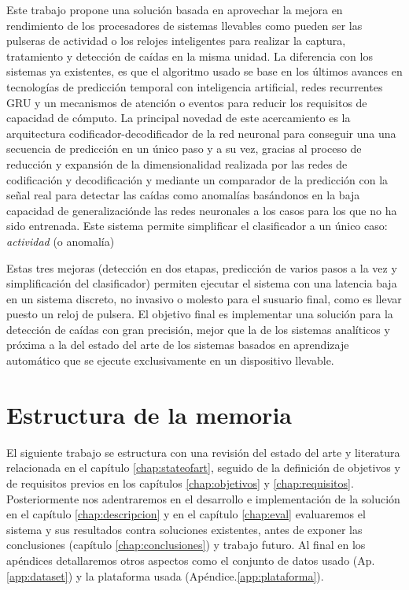 Este trabajo propone una solución basada en aprovechar la mejora en rendimiento de los procesadores de sistemas llevables como pueden ser las pulseras de actividad o los relojes inteligentes para realizar la captura, tratamiento y detección de caídas en la misma unidad. La diferencia con los sistemas ya existentes, es que el algoritmo usado se base en los últimos avances en tecnologías de predicción temporal con inteligencia artificial, redes recurrentes GRU y un mecanismos de atención o eventos para reducir los requisitos de capacidad de cómputo. La principal novedad de este acercamiento es la arquitectura codificador-decodificador de la red neuronal para conseguir una una secuencia de predicción en un único paso y a su vez, gracias al proceso de reducción y expansión de la dimensionalidad realizada por las redes de codificación y decodificación y mediante un comparador de la predicción con la señal real para detectar las caídas como anomalías basándonos en la baja capacidad de generalizaciónde las redes neuronales a los casos para los que no ha sido entrenada. Este sistema permite simplificar el clasificador a un único caso: \textit{actividad} (o anomalía)

Estas tres mejoras (detección en dos etapas, predicción de varios pasos a la vez y simplificación del clasificador) permiten ejecutar el sistema con una latencia baja en un sistema discreto, no invasivo o molesto para el susuario final, como es llevar puesto un reloj de pulsera. El objetivo final es implementar una solución para la detección de caídas con gran precisión, mejor que la de los sistemas analíticos y próxima a la del estado del arte de los sistemas basados en aprendizaje automático que se ejecute exclusivamente en un dispositivo llevable.

\section{Estructura de la memoria}

El siguiente trabajo se estructura con una revisión del estado del arte y literatura relacionada en el capítulo \ref{chap:stateofart}, seguido de la definición de objetivos y de requisitos previos en los capítulos \ref{chap:objetivos} y \ref{chap:requisitos}. Posteriormente nos adentraremos en el desarrollo e implementación de la solución en el capítulo \ref{chap:descripcion} y en el capítulo \ref{chap:eval} evaluaremos el sistema y sus resultados contra soluciones existentes, antes de exponer las conclusiones (capítulo \ref{chap:conclusiones}) y trabajo futuro. Al final en los apéndices detallaremos otros aspectos como el conjunto de datos usado (Ap.\ref{app:dataset}) y la plataforma usada (Apéndice.\ref{app:plataforma}).

